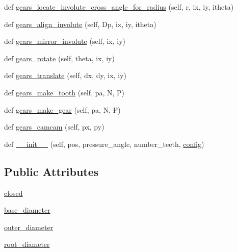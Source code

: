 \begin{DoxyCompactItemize}
def \hyperlink{classgears_1_1_involute_gear_border_a1cb98d62d4cb7c7365925afd39b95769}{gears\+\_\+locate\+\_\+involute\+\_\+cross\+\_\+angle\+\_\+for\+\_\+radius} (self, r, ix, iy, itheta)
\item 
def \hyperlink{classgears_1_1_involute_gear_border_a04c60a984a7d9faaf56f5e670d722780}{gears\+\_\+align\+\_\+involute} (self, Dp, ix, iy, itheta)
\item 
def \hyperlink{classgears_1_1_involute_gear_border_a51be3fc3ea32eee6b7481a110cfca4d5}{gears\+\_\+mirror\+\_\+involute} (self, ix, iy)
\item 
def \hyperlink{classgears_1_1_involute_gear_border_a402554ab5f2304830ee5878ba14c1d19}{gears\+\_\+rotate} (self, theta, ix, iy)
\item 
def \hyperlink{classgears_1_1_involute_gear_border_a9e1f46165954de32ec23e2efb5272d35}{gears\+\_\+translate} (self, dx, dy, ix, iy)
\item 
def \hyperlink{classgears_1_1_involute_gear_border_a03d205088c8b4621a09897f1cea18f0e}{gears\+\_\+make\+\_\+tooth} (self, pa, N, P)
\item 
def \hyperlink{classgears_1_1_involute_gear_border_aad7b930d16d02bfd6313bd0508572e16}{gears\+\_\+make\+\_\+gear} (self, pa, N, P)
\item 
def \hyperlink{classgears_1_1_involute_gear_border_a3f38d8790bdcf8b1cf33a0e496e8491a}{gears\+\_\+camcam} (self, px, py)
\item 
def \hyperlink{classgears_1_1_involute_gear_border_af2baab9361ff887f6ccd618f036cff96}{\+\_\+\+\_\+init\+\_\+\+\_\+} (self, pos, pressure\+\_\+angle, number\+\_\+teeth, \hyperlink{classpath_1_1_path_a889e352f02dba833077975ce855276ed}{config})
\end{DoxyCompactItemize}
\subsection*{Public Attributes}
\begin{DoxyCompactItemize}
\item 
\hyperlink{classgears_1_1_involute_gear_border_a3082fbde89cd8d0b7d7ab22002fb1eb9}{closed}
\item 
\hyperlink{classgears_1_1_involute_gear_border_af2b72779858b618dd4c69ccc529cdb13}{base\+\_\+diameter}
\item 
\hyperlink{classgears_1_1_involute_gear_border_ac7cc57277160a2575a1dbe61fb4b1743}{outer\+\_\+diameter}
\item 
\hyperlink{classgears_1_1_involute_gear_border_a0aabdca00ea7bbd94fb4a922f7948559}{root\+\_\+diameter}
\end{DoxyCompactItemize}
